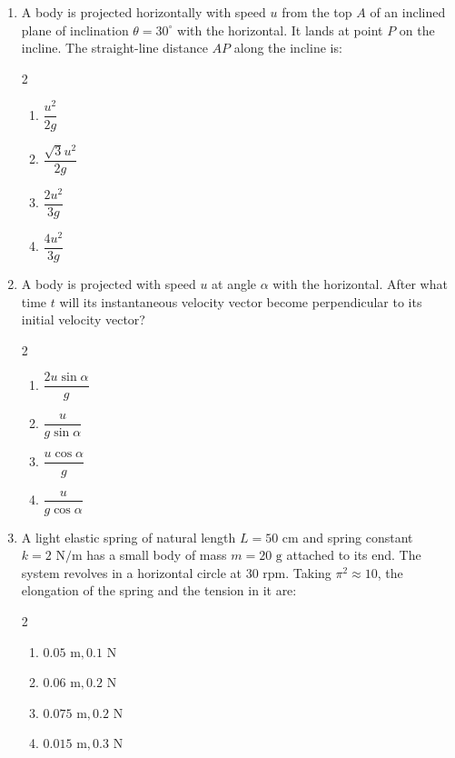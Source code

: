 \documentclass[11pt,a4paper]{article}
\begin{document}
\begin{enumerate}[label=\textbf{\textcolor{l3Crimson}{Q\arabic*.}},leftmargin=24pt,itemsep=10pt,start=51]
  \item A body is projected horizontally with speed $u$ from the top $A$ of an inclined plane of inclination $\theta = 30^\circ$ with the horizontal. It lands at point $P$ on the incline. The straight-line distance $AP$ along the incline is:
  \begin{multicols}{2}
  \begin{enumerate}[label=\textbf{\textcolor{primaryDark}{(\Alph*)}},itemsep=2pt]
    \item $\dfrac{u^2}{2g}$
    \item $\dfrac{\sqrt{3}u^2}{2g}$
    \item $\dfrac{2u^2}{3g}$
    \item $\dfrac{4u^2}{3g}$
  \end{enumerate}
  \end{multicols}

  \item A body is projected with speed $u$ at angle $\alpha$ with the horizontal. After what time $t$ will its instantaneous velocity vector become perpendicular to its initial velocity vector?
  \begin{multicols}{2}
  \begin{enumerate}[label=\textbf{\textcolor{primaryDark}{(\Alph*)}},itemsep=2pt]
    \item $\dfrac{2u\sin\alpha}{g}$
    \item $\dfrac{u}{g\sin\alpha}$
    \item $\dfrac{u\cos\alpha}{g}$
    \item $\dfrac{u}{g\cos\alpha}$
  \end{enumerate}
  \end{multicols}

  \item A light elastic spring of natural length $L = 50\text{ cm}$ and spring constant $k = 2\text{ N/m}$ has a small body of mass $m = 20\text{ g}$ attached to its end. The system revolves in a horizontal circle at $30\text{ rpm}$. Taking $\pi^2 \approx 10$, the elongation of the spring and the tension in it are:
  \begin{multicols}{2}
  \begin{enumerate}[label=\textbf{\textcolor{primaryDark}{(\Alph*)}},itemsep=2pt]
    \item $0.05\text{ m}, 0.1\text{ N}$
    \item $0.06\text{ m}, 0.2\text{ N}$
    \item $0.075\text{ m}, 0.2\text{ N}$
    \item $0.015\text{ m}, 0.3\text{ N}$
  \end{enumerate}
  \end{multicols}


\end{enumerate}
\end{document}
